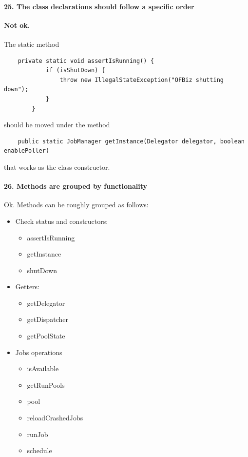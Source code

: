 \documentclass[english]{article}
\begin{document}
\paragraph{25. The class declarations should follow a specific order}
\textcolor{cornellred}{\textbf{Not ok.}}
\paragraph{}

The static method 
\begin{lstlisting}
	private static void assertIsRunning() {
	        if (isShutDown) {
	            throw new IllegalStateException("OFBiz shutting down");
	        }
	    }
\end{lstlisting}
should be moved under the method

\begin{lstlisting}
	public static JobManager getInstance(Delegator delegator, boolean enablePoller)
\end{lstlisting}
that works as the class constructor.

\paragraph{26. Methods are grouped by functionality}
Ok.
Methods can be roughly grouped as follows:
\begin{itemize}
	\item Check status and constructors:
	\begin{itemize}
		\item{assertIsRunning}
		\item{getInstance}
		\item{shutDown}
	\end{itemize}

	\item Getters:
	\begin{itemize}
		\item{getDelegator}
		\item{getDispatcher}
		\item{getPoolState}
	\end{itemize}

	\item Jobs operations
	\begin{itemize}
		\item{isAvailable}
		\item{getRunPools}
		\item{pool}
		\item{reloadCrashedJobs}
		\item{runJob}
		\item{schedule}
	\end{itemize}
\end{itemize}
\end{document}
